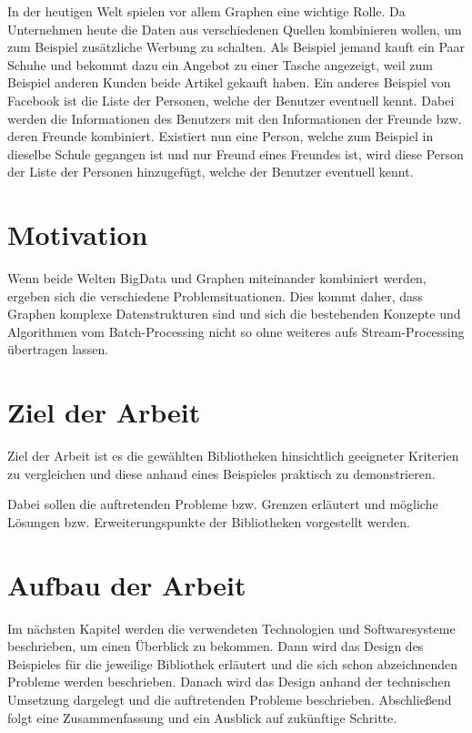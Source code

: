 In der heutigen Welt spielen vor allem Graphen eine wichtige Rolle. Da 
Unternehmen heute die Daten aus verschiedenen Quellen kombinieren wollen, um zum
Beispiel zusätzliche Werbung zu schalten. Als Beispiel jemand kauft ein Paar
Schuhe und bekommt dazu ein Angebot zu einer Tasche angezeigt, weil zum
Beispiel anderen Kunden beide Artikel gekauft haben. Ein anderes Beispiel von
Facebook ist die Liste der Personen, welche der Benutzer eventuell kennt.
Dabei werden die Informationen des Benutzers mit den Informationen der Freunde
bzw. deren Freunde kombiniert. Existiert nun eine Person, welche zum Beispiel
in dieselbe Schule gegangen ist und nur Freund eines Freundes ist, wird diese
Person der Liste der Personen hinzugefügt, welche der Benutzer eventuell kennt.

\section{Motivation}
Wenn beide Welten \gls{BigData} und Graphen miteinander kombiniert werden,
ergeben sich die verschiedene Problemsituationen. Dies kommt daher, dass Graphen
komplexe Datenstrukturen sind und sich die bestehenden Konzepte und Algorithmen
vom Batch-Processing nicht so ohne weiteres aufs Stream-Processing übertragen
lassen.


\section{Ziel der Arbeit}
Ziel der Arbeit ist es die gewählten Bibliotheken hinsichtlich geeigneter
Kriterien zu vergleichen und diese anhand eines Beispieles praktisch zu
demonstrieren.

Dabei sollen die auftretenden Probleme bzw. Grenzen erläutert und mögliche
Lösungen bzw. Erweiterungspunkte der Bibliotheken vorgestellt werden.

\section{Aufbau der Arbeit}
Im nächsten Kapitel werden die verwendeten Technologien und Softwaresysteme
beschrieben, um einen Überblick zu bekommen. Dann wird das Design des Beispieles
für die jeweilige Bibliothek erläutert und die sich schon abzeichnenden Probleme
werden beschrieben. Danach wird das Design anhand der technischen Umsetzung
dargelegt und die auftretenden Probleme beschrieben. Abschließend folgt eine
Zusammenfassung und ein Ausblick auf zukünftige Schritte.
